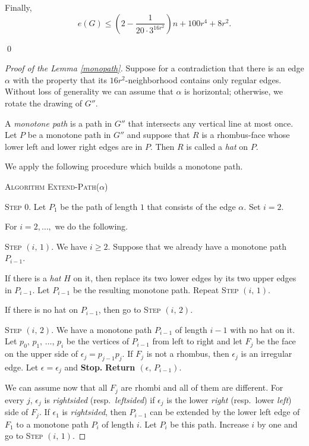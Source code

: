 \documentclass[12pt]{article}
\theoremstyle{plain}
\theoremstyle{definition}
\theoremstyle{remark}
\begin{document}
Finally,
\[e(G)\le \left(2-\frac{1}{20\cdot 3^{16r^2}} \right)n+100r^4+8r^2.\]




\qed

\begin{proof}[Proof of the Lemma \ref{monopath}]
Suppose for a contradiction that there is an edge $\alpha$ 
with the property that its $16r^2$-neighborhood contains only regular edges. Without loss of generality we can assume that $\alpha$ is horizontal; otherwise, we rotate the drawing of $G''$.
\smallskip

A \emph{monotone path} is a path in $G''$ that intersects any vertical line at most once. 
Let $P$ be a monotone path in $G''$ and suppose that $R$ is a 
rhombus-face whose lower left and lower right edges are in $P$. Then $R$ is called a \emph{hat} on $P$. 
\smallskip

We apply the following procedure which builds a monotone path.

\bigskip


\textsc{Algorithm Extend-Path($\alpha$)}

\smallskip

\noindent \textsc{Step $0$.} Let $P_1$ be the path of length $1$ that consists of the edge $\alpha$.
Set $i=2$.


\smallskip

For $i=2, \ldots, $ we do the following.

\noindent \textsc{Step $(i, \, 1)$}. We have $i\ge 2$. 
Suppose that we already have a monotone path $P_{i-1}$.

If there is a \emph{hat} $H$ on it, then replace its two lower edges by its two upper edges in $P_{i-1}$. Let $P_{i-1}$ be the resulting monotone path.
Repeat \textsc{Step $(i, \, 1)$}.

If there is no hat on $P_{i-1}$, then go to \textsc{Step $(i, \, 2)$}.

\smallskip

\noindent \textsc{Step $(i, \, 2)$}. We have a monotone path $P_{i-1}$ of length $i-1$ with no hat on it.
Let $p_0, \, p_1, \, \ldots, \, p_i$ be the vertices of $P_{i-1}$ from left to right and let $F_j$ be the face on the upper side of 
$\epsilon_j=p_{j-1}p_j$. If $F_j$ is not a rhombus, then $\epsilon_j$ is an irregular edge. Let $\epsilon=\epsilon_j$ and {\textbf{Stop.}} \textbf{Return $(\epsilon, \, P_{i-1})$}.

\smallskip
We can assume now that all $F_j$ are rhombi and all of them are different. 
For every $j$, $\epsilon_j$ 
is \emph{rightsided} (resp.\ \emph{leftsided})
if $\epsilon_j$ is the lower \emph{right} (resp.\ lower \emph{left}) side of $F_j$. 
If $\epsilon_1$ is \emph{rightsided}, 
then $P_{i-1}$ can be extended by the lower left edge of $F_1$ to a monotone path $P_i$ 
of length $i$. Let  
$P_{i}$ be this path. Increase $i$ by one and go to \textsc{Step $(i, \, 1)$}.


\end{proof}
\end{document}
